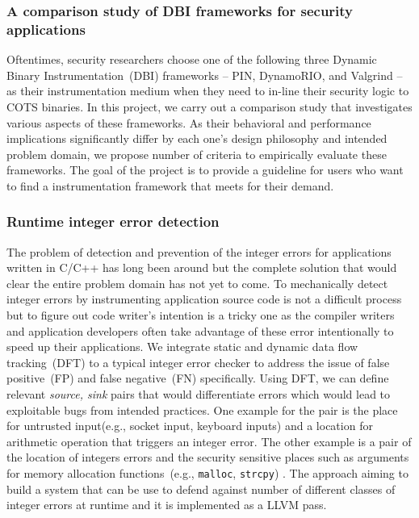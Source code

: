 \documentclass[letterpaper, 10pt]{article}
\begin{document}
\begin{small}
\subsubsection*{A comparison study of DBI frameworks for security applications}
%
Oftentimes, security researchers choose one of the following three Dynamic
Binary Instrumentation~(DBI) frameworks -- PIN, DynamoRIO, and Valgrind -- as
their instrumentation medium when they need to in-line their security logic to
COTS binaries.
%
In this project, we carry out a comparison study that investigates various
aspects of these frameworks. As their behavioral and performance implications
significantly differ by each one's design philosophy and intended problem
domain, we propose number of criteria  to empirically evaluate these frameworks.
%
The goal of the project is to provide a guideline for users who want to find a
instrumentation framework that meets for their demand.

\subsubsection*{Runtime integer error detection}

The problem of detection and prevention of the integer errors for applications
written in C/C++ has long been around but the complete solution that would
clear the entire problem domain has not yet to come. 
%
To mechanically detect integer errors by instrumenting application source code
is not a difficult process but to figure out code writer's intention is a
tricky one as the compiler writers and application developers often take
advantage of these error intentionally to speed up their applications.
%
We integrate static and dynamic data flow tracking~(DFT) to a typical integer
error checker to address the issue of false positive~(FP) and false
negative~(FN) specifically. Using DFT, we can define relevant {\it source,
sink} pairs that would differentiate errors which would lead to exploitable
bugs from intended practices. One example for the pair is the place for
untrusted input(e.g., socket input, keyboard inputs) and a location for
arithmetic operation that triggers an integer error. The other example is a
pair of the location of integers errors and the security sensitive places such
as arguments for memory allocation functions~(e.g., {\tt malloc}, {\tt strcpy}) .
%
The approach aiming to build a system that can be use to defend against number
of different classes of integer errors at runtime and it is implemented as a
LLVM pass.


\end{small}
\end{document}
